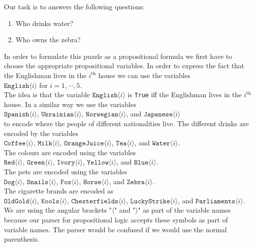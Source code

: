 Our task is to answers the following questions:
\begin{enumerate}
\item Who drinks water?
\item Who owns the zebra?
\end{enumerate}

In order to formulate this puzzle as a propositional formula we first have to
choose the appropriate propositional variables.  In order to express the fact
that the Englishman lives in the $i^\textrm{th}$ house we can use the variables
\\[0.2cm]
\hspace*{1.3cm}
$\texttt{English}\langle i \rangle$ \quad for $i=1,\cdots,5$.
\\[0.2cm]
The idea is that the variable $\texttt{English}\langle i \rangle$ is \texttt{True} iff the
Englishman lives in the  $i^\textrm{th}$ house.  In a similar way we use the
variables
\\[0.2cm]
\hspace*{1.3cm}
$\texttt{Spanish}\langle i \rangle$,\;
$\texttt{Ukrainian}\langle i \rangle$,\;
$\texttt{Norwegian}\langle i \rangle$,\; and 
$\texttt{Japanese}\langle i \rangle$
\\[0.2cm]
to encode where the people of different nationalities live.
The different drinks are encoded by the variables
\\[0.2cm]
\hspace*{1.3cm}
$\texttt{Coffee}\langle i \rangle$,\; $\texttt{Milk}\langle i \rangle$,\; $\texttt{OrangeJuice}\langle i \rangle$,\; $\texttt{Tea}\langle i \rangle$,\; and $\texttt{Water}\langle i \rangle$.
\\[0.2cm] 
The colours are encoded using the variables 
\\[0.2cm]
\hspace*{1.3cm}
$\texttt{Red}\langle i \rangle$,\;
$\texttt{Green}\langle i \rangle$,\;
$\texttt{Ivory}\langle i \rangle$,\;
$\texttt{Yellow}\langle i \rangle$,\; and $\texttt{Blue}\langle i \rangle$.
\\[0.2cm]
The pets are encoded using the variables
\\[0.2cm]
\hspace*{1.3cm}
$\texttt{Dog}\langle i \rangle$,\;
$\texttt{Snails}\langle i \rangle$,\;
$\texttt{Fox}\langle i \rangle$,\;
$\texttt{Horse}\langle i \rangle$,\;
and $\texttt{Zebra}\langle i \rangle$.
\\[0.2cm]
The cigarette brands are encoded as
\\[0.2cm]
\hspace*{1.3cm}
$\texttt{OldGold}\langle i \rangle$,\; $\texttt{Kools}\langle i \rangle$,\;
$\texttt{Chesterfields}\langle i \rangle$,\; $\texttt{LuckyStrike}\langle i \rangle$,\; and
$\texttt{Parliaments}\langle i \rangle$.
\\[0.2cm]
We are using the angular brackets "$\langle$" and "$\rangle$" as part of the
variable names because our parser for propositional logic accepts these symbols
as part of variable names.  The parser would be confused if we would use the
normal parenthesis.  

